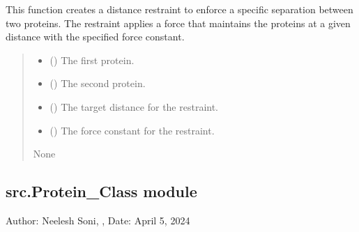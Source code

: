 \documentclass[letterpaper,10pt,english]{sphinxmanual}
\begin{document}
\begin{fulllineitems}
\begin{fulllineitems}
\sphinxAtStartPar
This function creates a distance restraint to enforce a specific separation
between two proteins. The restraint applies a force that maintains the
proteins at a given distance with the specified force constant.
\begin{quote}\begin{description}
\begin{itemize}
\item {} 
\sphinxAtStartPar
{} ({\hyperref[\detokenize{src:src.Protein_Class.Protein}]{}}) \textendash{} The first protein.

\item {} 
\sphinxAtStartPar
{} ({\hyperref[\detokenize{src:src.Protein_Class.Protein}]{}}) \textendash{} The second protein.

\item {} 
\sphinxAtStartPar
{} () \textendash{} The target distance for the restraint.

\item {} 
\sphinxAtStartPar
{} () \textendash{} The force constant for the restraint.

\end{itemize}

\sphinxAtStartPar
None

\end{description}\end{quote}

\end{fulllineitems}


\end{fulllineitems}



\subsection{src.Protein\_Class module}
\label{\detokenize{src:module-src.Protein_Class}}\label{\detokenize{src:src-protein-class-module}}
\sphinxAtStartPar
Author: Neelesh Soni, , 
Date: April 5, 2024
\end{document}
